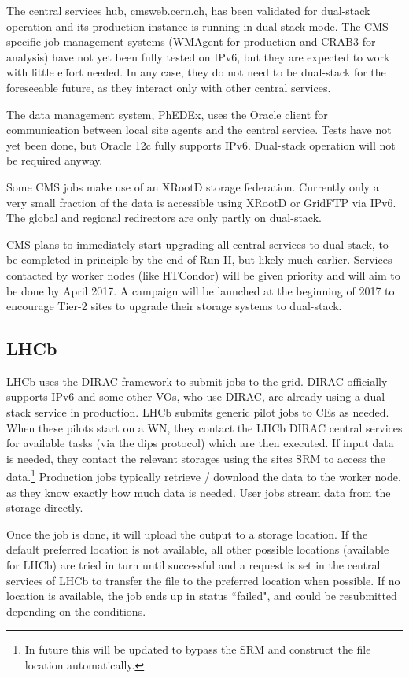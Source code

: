 \documentclass[a4paper]{jpconf}
\begin{document}
The central services hub, cmsweb.cern.ch, has been validated for
dual-stack operation and its production instance is running in
dual-stack mode. The CMS-specific job management systems (WMAgent for
production and CRAB3 for analysis) have not yet been fully tested on
IPv6, but they are expected to work with little effort needed. In any
case, they do not need to be dual-stack for the foreseeable future,
as they interact only with other central services.

The data management system, PhEDEx, uses the Oracle client for
communication between local site agents and the central service. Tests
have not yet been done, but Oracle 12c fully supports IPv6. Dual-stack
operation will not be required anyway.

Some CMS jobs make use of an XRootD storage federation.  Currently only a very small fraction
of the data is accessible using XRootD or GridFTP via IPv6. The global
and regional redirectors are only partly on dual-stack.

CMS plans to immediately start upgrading all central services to
dual-stack, to be completed in principle by the end of Run II, but
likely much earlier. Services contacted by worker nodes (like
HTCondor) will be given priority and will aim to be done by April
2017. A campaign will be launched at the beginning of 2017 to
encourage Tier-2 sites to upgrade their storage systems to dual-stack.


\subsection{LHCb}
LHCb uses the DIRAC framework to submit jobs to the grid. DIRAC
officially supports IPv6 and some other VOs, who use DIRAC, are
already using a dual-stack service in production.  LHCb submits
generic pilot jobs to CEs as needed. When these pilots start on a WN,
they contact the LHCb DIRAC central services for available tasks (via
the dips protocol) which are then executed. If input data is needed,
they contact the relevant storages using the sites SRM to access
the data.\footnote{In future this will be updated to bypass the SRM and construct the file 
location automatically.} Production jobs typically retrieve / download the data to
the worker node, as they know exactly how much data is needed. User
jobs stream data from the storage directly.

Once the job is done, it will upload the output to a storage
location. If the default preferred location is not available, all
other possible locations (available for LHCb) are tried in turn until
successful and a request is set in the central services of LHCb to
transfer the file to the preferred location when possible. If no
location is available, the job ends up in status ``failed", and could
be resubmitted depending on the conditions.
\end{document}
